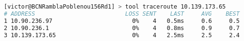 \begin{lstlisting}[language=bash, caption={End-to-End  connectivity going through the Mesh Network.}]
[victor@BCNRamblaPoblenou156Rd1] > tool traceroute 10.139.173.65
# ADDRESS                          LOSS SENT    LAST     AVG    BEST   WORST STD-DEV STA..
1 10.90.236.97                       0%    4   0.5ms     0.6     0.5     0.7     0.1      
2 10.90.236.1                        0%    4   0.8ms     0.9     0.7     1.2     0.2      
3 10.139.173.65                      0%    4   2.5ms     2.5     2.4     2.6     0.1
\end{lstlisting}